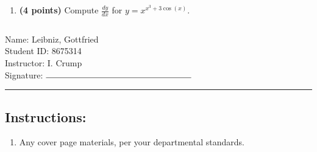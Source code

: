 \documentclass[12pt]{amsart}
\begin{document}
\begin{enumerate}
\vfill 
\def \varexp{3}\def \newexp{2}\def \trigcoeff{3}\def \trigval{+3}\def \oppval{-3}
\item {\bf (4 points)} 
 Compute $\frac{dy}{dx}$ for $y=x^{x^\varexp \trigval \cos(x)}$.

\vfill 
\newpage  $ $   \newpage\end{enumerate}\graphicspath{{C:/Users/iainc/anaconda3/Randomizer/MATH 1001/Midterm 1/}}\setcounter{page}{1}


\thispagestyle{fancy}

 \noindent Name: Leibniz, Gottfried \vspace{.3cm} \\\noindent Student ID: 8675314 \vspace{.3cm} \\\noindent Instructor: I. Crump \vspace{.3cm} \\\noindent Signature: $\rule{6cm}{0.15mm}$ \vspace{.3cm} \\ 



\vspace{.4cm}


\vspace{.4cm}

\hrule

\subsection*{Instructions:} \begin{enumerate}[1.]
\item Any cover page materials, per your departmental standards.
\end{enumerate}
\end{document}

